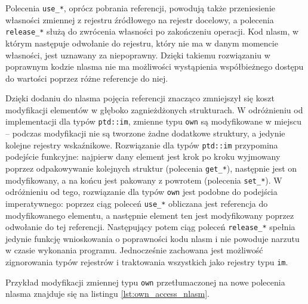 \documentclass[licencjacka]{pracamgr}
\begin{document}
Polecenia \texttt{use\_*}, oprócz pobrania referencji, powodują także przeniesienie własności zmiennej z rejestru
źródłowego na rejestr docelowy, a polecenia \texttt{release\_*} służą do zwrócenia własności po zakończeniu
operacji. Kod nlasm, w którym następuje odwołanie do rejestru, który nie ma w danym momencie własności,
jest uznawany za niepoprawny. Dzięki takiemu rozwiązaniu w poprawnym kodzie nlasma nie ma możliwości wystąpienia
współbieżnego dostępu do wartości poprzez różne referencje do niej.

Dzięki dodaniu do nlasma pojęcia referencji znacząco zmniejszył się koszt modyfikacji elementów w głęboko
zagnieżdżonych strukturach. W odróżnieniu od implementacji dla typów \texttt{ptd::im}, zmienne typu \texttt{own}
są modyfikowane w miejscu -- podczas modyfikacji nie są tworzone żadne dodatkowe struktury, a jedynie
kolejne rejestry wskaźnikowe. Rozwiązanie dla typów \texttt{ptd::im} przypomina podejście funkcyjne:
najpierw dany element jest krok po kroku wyjmowany poprzez odpakowywanie kolejnych struktur
(polecenia \texttt{get\_*}), następnie jest on modyfikowany, a na końcu jest pakowany z powrotem (polecenia
\texttt{set\_*}). W odróżnieniu od tego, rozwiązanie dla typów \texttt{own} jest podobne do podejścia
imperatywnego: poprzez ciąg poleceń \texttt{use\_*} obliczana jest referencja do modyfikowanego elementu, a
następnie element ten jest modyfikowany poprzez odwołanie do tej referencji.
Następujący potem ciąg poleceń \texttt{release\_*}
spełnia jedynie funkcję wnioskowania o poprawności kodu nlasm i nie powoduje narzutu w czasie wykonania programu.
Jednocześnie zachowana jest możliwość zignorowania typów rejestrów i traktowania wszystkich jako rejestry
typu \texttt{im}.

Przykład modyfikacji zmiennej typu \texttt{own} przetłumaczonej na nowe polecenia nlasma znajduje się na listingu 
\ref{lst:own_access_nlasm}.
\end{document}
